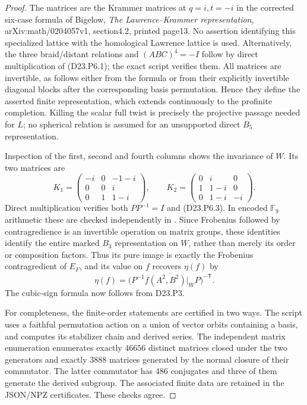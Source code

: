 \begin{proof}
The matrices are the Krammer matrices at $q=i,t=-i$ in the
corrected six-case formula of Bigelow, \emph{The Lawrence--Krammer
representation}, arXiv:math/0204057v1, section4.2, printed page13.
No assertion identifying this specialized lattice with the
homological Lawrence lattice is used. Alternatively, the three
braid/distant relations and $(ABC)^4=-I$ follow by direct
multiplication of (D23.P6.1); the exact script
 verifies them.
All matrices are invertible, as follows either from the formula
or from their explicitly invertible diagonal blocks after the
corresponding basis permutation. Hence they define the asserted
finite representation, which extends continuously to the profinite
completion. Killing the scalar full twist is precisely the
projective passage needed for $L$; no spherical relation is
assumed for an unsupported direct $B_5$ representation.

Inspection of the first, second and fourth columns shows the
invariance of $W$. Its two matrices are
\[
K_1=\begin{pmatrix}-i&0&-1-i\\0&0&i\\0&1&1-i\end{pmatrix},
\qquad
K_2=\begin{pmatrix}0&i&0\\1&1-i&0\\0&1-i&-i\end{pmatrix}.
\]
Direct multiplication verifies both $PP^{-1}=I$ and
(D23.P6.3). In encoded $\mathbb F_9$ arithmetic these are
checked independently in
.
Since Frobenius followed by contragredience is an invertible
operation on matrix groups, these identities identify the entire
marked $B_3$ representation on $W$, rather than merely its order
or composition factors. Thus its pure image is exactly the
Frobenius contragredient of $E_F$, and its value on $f$ recovers
$\eta(f)$ by
\[
 \eta(f)=\overline{\bigl(P^{-1}f(A^2,B^2)|_W P\bigr)^{-\mathsf T}}.
\]
The cubic-sign formula now follows from D23.P3.

For completeness, the finite-order statements are certified in two
ways. The script 
uses a faithful permutation action on a union of vector orbits
containing a basis, and computes its stabilizer chain and derived
series. The independent matrix enumeration
 enumerates exactly
$46656$ distinct matrices closed under the two generators and
exactly $3888$ matrices generated by the normal closure of their
commutator. The latter commutator has $486$ conjugates and three
of them generate the derived subgroup. The associated finite data
are retained in the JSON/NPZ certificates. These checks agree.


\end{proof}
